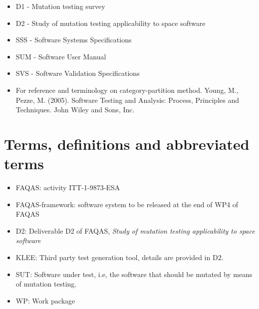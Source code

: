 \begin{itemize}
\item{D1 - Mutation testing survey}
\item{D2 - Study of mutation testing applicability to space software}
\item{SSS - Software Systems Specifications}
\item{SUM - Software User Manual}
\item{SVS - Software Validation Specifications}
\item{For reference and terminology on category-partition method. Young, M., Pezze, M. (2005). Software Testing and Analysis: Process, Principles and Techniques. John Wiley and Sons, Inc.}
\end{itemize}

\chapter{Terms, definitions and abbreviated terms}

\begin{itemize}
\item{FAQAS}: activity ITT-1-9873-ESA
\item{FAQAS-framework}: software system to be released at the end of WP4 of FAQAS
\item{D2}: Deliverable D2 of FAQAS, \emph{Study of mutation testing applicability to space software}
\item{KLEE}: Third party test generation tool, details are provided in D2.
\item{SUT}: Software under test, i.e, the software that should be mutated by means of mutation testing.
\item{WP}: Work package
\end{itemize}

\clearpage
 

